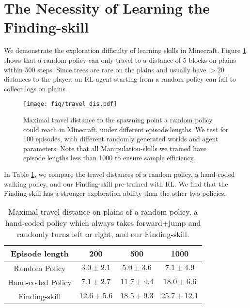 \documentclass{article}
\newcommand{\mcbed}{\texttt{[image: minecraft/bed.png]}}
\newcommand{\mcbeef}{\texttt{[image: minecraft/beef.png]}}
\newcommand{\mcbowl}{\texttt{[image: minecraft/bowl.png]}}
\newcommand{\mcchest}{\texttt{[image: minecraft/chest.png]}}
\newcommand{\mccraftingtable}{\texttt{[image: minecraft/crafting\_table.png]}}
\newcommand{\mcmilkbucket}{\texttt{[image: minecraft/milk\_bucket.png]}}
\newcommand{\mcmutton}{\texttt{[image: minecraft/mutton.png]}}
\newcommand{\mcsign}{\texttt{[image: minecraft/sign.png]}}
\newcommand{\mctrapdoor}{\texttt{[image: minecraft/trapdoor.png]}}
\newcommand{\mcwoodenpickaxe}{\texttt{[image: minecraft/wooden\_pickaxe.png]}}
\newcommand{\mcwool}{\texttt{[image: minecraft/wool.png]}}
\begin{document}





\newpage
\appendix

\section{The Necessity of Learning the Finding-skill}
\label{appendix:find-skill}

We demonstrate the exploration difficulty of learning skills in Minecraft. Figure \ref{fig:random-travel} shows that a random policy can only travel to a distance of 5 blocks on plains within 500 steps. Since trees are rare on the plains and usually have $>20$ distances to the player, an RL agent starting from a random policy can fail to collect logs on plains.

\begin{figure}[htbp]
  \centering
  \texttt{[image: fig/travel\_dis.pdf]}
  \vspace{-2mm}
  \caption{Maximal travel distance to the spawning point a random policy could reach in Minecraft, under different episode lengths. We test for 100 episodes, with different randomly generated worlds and agent parameters. Note that all Manipulation-skills we trained have episode lengths less than 1000 to ensure sample efficiency.}
  \label{fig:random-travel}
\end{figure}

In Table \ref{tab:travel-dis}, we compare the travel distances of a random policy, a hand-coded walking policy, and our Finding-skill pre-trained with RL. We find that the Finding-skill has a stronger exploration ability than the other two policies.

\begin{table}[htbp]
  \caption{Maximal travel distance on plains of a random policy, a hand-coded policy which always takes forward+jump and randomly turns left or right, and our Finding-skill. }
  \label{tab:travel-dis}
  \centering
  \begin{tabular}{cccc}
    \toprule
    Episode length & 200 & 500 & 1000 \\
    \midrule
    Random Policy & $3.0 \pm 2.1$ & $5.0 \pm 3.6$ & $7.1 \pm 4.9$ \\
    Hand-coded Policy & $7.1 \pm 2.7$ & $11.7 \pm 4.4$ & $18.0 \pm 6.6$ \\
    Finding-skill & $12.6 \pm 5.6$ & $18.5 \pm 9.3$ & $25.7 \pm 12.1$ \\
    \bottomrule
  \end{tabular}
\end{table}
\end{document}
